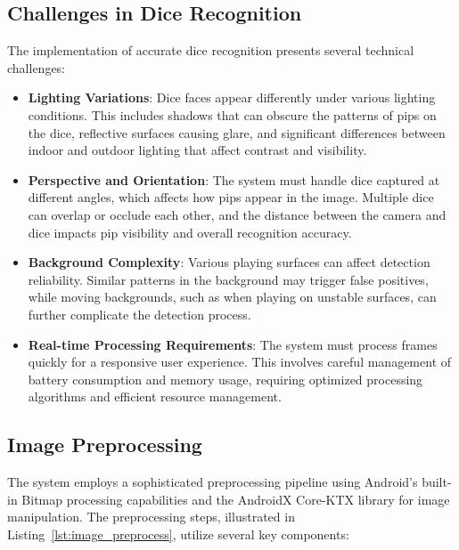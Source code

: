 \subsection{Challenges in Dice Recognition}

The implementation of accurate dice recognition presents several technical challenges:
\begin{itemize}
    \item \textbf{Lighting Variations}: Dice faces appear differently under various lighting conditions. This includes shadows that can obscure the patterns of pips on the dice, reflective surfaces causing glare, and significant differences between indoor and outdoor lighting that affect contrast and visibility.
    \item \textbf{Perspective and Orientation}: The system must handle dice captured at different angles, which affects how pips appear in the image. Multiple dice can overlap or occlude each other, and the distance between the camera and dice impacts pip visibility and overall recognition accuracy.
    \item \textbf{Background Complexity}: Various playing surfaces can affect detection reliability. Similar patterns in the background may trigger false positives, while moving backgrounds, such as when playing on unstable surfaces, can further complicate the detection process.
    \item \textbf{Real-time Processing Requirements}: The system must process frames quickly for a responsive user experience. This involves careful management of battery consumption and memory usage, requiring optimized processing algorithms and efficient resource management.
\end{itemize}

\subsection{Image Preprocessing}

The system employs a sophisticated preprocessing pipeline using Android's built-in Bitmap processing capabilities and the AndroidX Core-KTX library for image manipulation. The preprocessing steps, illustrated in Listing~\ref{lst:image_preprocess}, utilize several key components:

